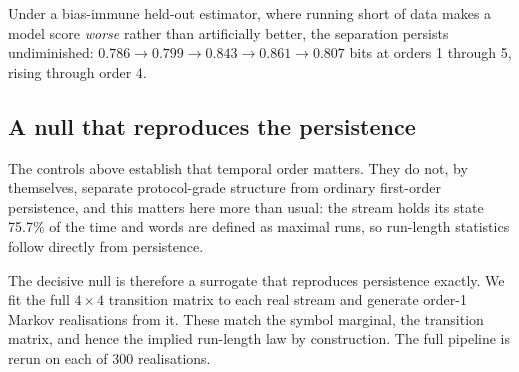 \documentclass[11pt,a4paper]{article}
\begin{document}
Under a bias-immune held-out estimator, where running short of data makes a model score
\emph{worse} rather than artificially better, the separation persists undiminished:
$0.786 \rightarrow 0.799 \rightarrow 0.843 \rightarrow 0.861 \rightarrow 0.807$ bits at
orders 1 through 5, rising through order 4.

\subsection{A null that reproduces the persistence}
\label{sec:markov}

The controls above establish that temporal order matters. They do not, by themselves,
separate protocol-grade structure from ordinary first-order persistence, and this
matters here more than usual: the stream holds its state 75.7\% of the time and words
are defined as maximal runs, so run-length statistics follow directly from persistence.

The decisive null is therefore a surrogate that reproduces persistence exactly. We fit
the full $4 \times 4$ transition matrix to each real stream and generate order-1 Markov
realisations from it. These match the symbol marginal, the transition matrix, and hence
the implied run-length law by construction. The full pipeline is rerun on each of 300
realisations.
\end{document}
